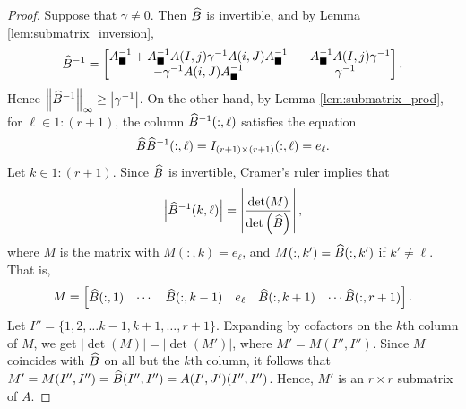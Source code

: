 \documentclass{article}
\begin{document}
\begin{proof}
		Suppose that $\gamma \ne 0$. Then $\widehat{B}$ is invertible, and by Lemma \ref{lem:submatrix_inversion},
		\begin{equation}
			\widehat{B}^{-1} = \left[\begin{matrix}
				A_\blacksquare^{-1} + A_\blacksquare^{-1}A(I,j)\gamma^{-1}A(i,J)A_\blacksquare^{-1} & -A_\blacksquare^{-1}A(I,j)\gamma^{-1} \\
				-\gamma^{-1}A(i,J)A_\blacksquare^{-1} & \gamma^{-1}
			\end{matrix}\right].
		\end{equation}
		Hence $\left\lVert \widehat{B}^{-1} \right\rVert_\infty \ge \left|\gamma^{-1}\right|$. On the other hand, by Lemma \ref{lem:submatrix_prod}, for $\ell \in 1:(r+1)$, the column $\widehat{B}^{-1}(:, \ell)$ satisfies the equation
		\begin{equation}
			\widehat{B}\widehat{B}^{-1}(:,\ell) = I_{(r+1)\times(r+1)}(:,\ell) = e_\ell.
		\end{equation}
		Let $k \in 1:(r+1)$. Since $\widehat{B}$ is invertible, Cramer's ruler implies that
		\begin{equation}
			\left|\widehat{B}^{-1}(k,\ell)\right| = \left|\frac{\det(M)}{\det\left(\widehat{B}\right)}\right|,
		\end{equation}
		where $M$ is the matrix with $M(:, k) = e_\ell$, and $M(:, k') = \widehat{B}(:, k')$ if $k' \ne \ell$. That is,
		\begin{equation}
			M = \left[\begin{matrix}
				\widehat{B}(:, 1) & \cdots & \widehat{B}(:,k -1) & e_\ell& \widehat{B}(:,k + 1) & \cdots \widehat{B}(:, r+1)
			\end{matrix}\right].
		\end{equation}
		Let $I'' = \{1,2,\dots k -1, k + 1, \dots, r+1\}$. Expanding by cofactors on the $k$th column of $M$, we get $|\det(M)| = |\det(M')|$, where $M' = M(I'',I'')$. Since $M$ coincides with $\widehat{B}$ on all but the $k$th column, it follows that $M' = M(I'', I'') = \widehat{B}(I'',I'') = A(I',J')(I'', I'')$. Hence, $M'$ is an $r \times r$ submatrix of $A$. 
		

\end{proof}
\end{document}
